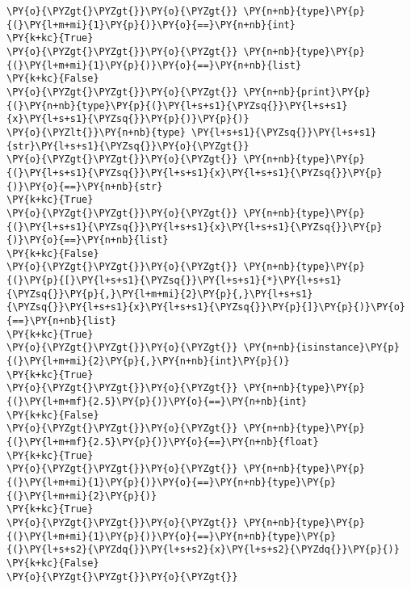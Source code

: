 \begin{Verbatim}[commandchars=\\\{\}]
\PY{o}{\PYZgt{}\PYZgt{}}\PY{o}{\PYZgt{}} \PY{n+nb}{type}\PY{p}{(}\PY{l+m+mi}{1}\PY{p}{)}\PY{o}{==}\PY{n+nb}{int}
\PY{k+kc}{True}
\PY{o}{\PYZgt{}\PYZgt{}}\PY{o}{\PYZgt{}} \PY{n+nb}{type}\PY{p}{(}\PY{l+m+mi}{1}\PY{p}{)}\PY{o}{==}\PY{n+nb}{list}
\PY{k+kc}{False}
\PY{o}{\PYZgt{}\PYZgt{}}\PY{o}{\PYZgt{}} \PY{n+nb}{print}\PY{p}{(}\PY{n+nb}{type}\PY{p}{(}\PY{l+s+s1}{\PYZsq{}}\PY{l+s+s1}{x}\PY{l+s+s1}{\PYZsq{}}\PY{p}{)}\PY{p}{)}
\PY{o}{\PYZlt{}}\PY{n+nb}{type} \PY{l+s+s1}{\PYZsq{}}\PY{l+s+s1}{str}\PY{l+s+s1}{\PYZsq{}}\PY{o}{\PYZgt{}}
\PY{o}{\PYZgt{}\PYZgt{}}\PY{o}{\PYZgt{}} \PY{n+nb}{type}\PY{p}{(}\PY{l+s+s1}{\PYZsq{}}\PY{l+s+s1}{x}\PY{l+s+s1}{\PYZsq{}}\PY{p}{)}\PY{o}{==}\PY{n+nb}{str}
\PY{k+kc}{True}
\PY{o}{\PYZgt{}\PYZgt{}}\PY{o}{\PYZgt{}} \PY{n+nb}{type}\PY{p}{(}\PY{l+s+s1}{\PYZsq{}}\PY{l+s+s1}{x}\PY{l+s+s1}{\PYZsq{}}\PY{p}{)}\PY{o}{==}\PY{n+nb}{list}
\PY{k+kc}{False}
\PY{o}{\PYZgt{}\PYZgt{}}\PY{o}{\PYZgt{}} \PY{n+nb}{type}\PY{p}{(}\PY{p}{[}\PY{l+s+s1}{\PYZsq{}}\PY{l+s+s1}{*}\PY{l+s+s1}{\PYZsq{}}\PY{p}{,}\PY{l+m+mi}{2}\PY{p}{,}\PY{l+s+s1}{\PYZsq{}}\PY{l+s+s1}{x}\PY{l+s+s1}{\PYZsq{}}\PY{p}{]}\PY{p}{)}\PY{o}{==}\PY{n+nb}{list}
\PY{k+kc}{True}
\PY{o}{\PYZgt{}\PYZgt{}}\PY{o}{\PYZgt{}} \PY{n+nb}{isinstance}\PY{p}{(}\PY{l+m+mi}{2}\PY{p}{,}\PY{n+nb}{int}\PY{p}{)}
\PY{k+kc}{True}
\PY{o}{\PYZgt{}\PYZgt{}}\PY{o}{\PYZgt{}} \PY{n+nb}{type}\PY{p}{(}\PY{l+m+mf}{2.5}\PY{p}{)}\PY{o}{==}\PY{n+nb}{int} 
\PY{k+kc}{False}
\PY{o}{\PYZgt{}\PYZgt{}}\PY{o}{\PYZgt{}} \PY{n+nb}{type}\PY{p}{(}\PY{l+m+mf}{2.5}\PY{p}{)}\PY{o}{==}\PY{n+nb}{float}
\PY{k+kc}{True}
\PY{o}{\PYZgt{}\PYZgt{}}\PY{o}{\PYZgt{}} \PY{n+nb}{type}\PY{p}{(}\PY{l+m+mi}{1}\PY{p}{)}\PY{o}{==}\PY{n+nb}{type}\PY{p}{(}\PY{l+m+mi}{2}\PY{p}{)}
\PY{k+kc}{True}
\PY{o}{\PYZgt{}\PYZgt{}}\PY{o}{\PYZgt{}} \PY{n+nb}{type}\PY{p}{(}\PY{l+m+mi}{1}\PY{p}{)}\PY{o}{==}\PY{n+nb}{type}\PY{p}{(}\PY{l+s+s2}{\PYZdq{}}\PY{l+s+s2}{x}\PY{l+s+s2}{\PYZdq{}}\PY{p}{)}
\PY{k+kc}{False}
\PY{o}{\PYZgt{}\PYZgt{}}\PY{o}{\PYZgt{}} 
\end{Verbatim}
